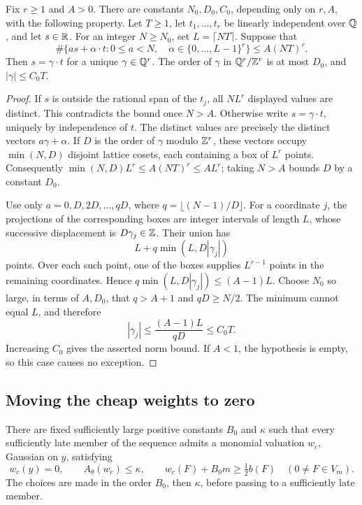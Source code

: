 \begin{lemma}\label{c:cheap-box-count}
Fix $r\ge1$ and $A>0$.  There are constants $N_0,D_0,C_0$, depending
only on $r,A$, with the following property.  Let $T\ge1$, let
$t_1,\ldots,t_r$ be linearly independent over $\mathbb Q$, and let $s\in\mathbb R$.
For an integer $N\ge N_0$, set $L=\lceil NT\rceil$.  Suppose that
\[
 \#\{as+\alpha\cdot t:0\le a<N,\quad
                    \alpha\in\{0,\ldots,L-1\}^r\}
       \le A(NT)^r.
\]
Then $s=\gamma\cdot t$ for a unique $\gamma\in\mathbb Q^r$.  The order of
$\gamma$ in $\mathbb Q^r/\mathbb Z^r$ is at most $D_0$, and
$|\gamma|\le C_0T$.
\end{lemma}

\begin{proof}
If $s$ is outside the rational span of the $t_j$, all $NL^r$ displayed
values are distinct.  This contradicts the bound once $N>A$.
Otherwise write $s=\gamma\cdot t$, uniquely by independence of $t$.
The distinct values are precisely the distinct vectors
$a\gamma+\alpha$.  If $D$ is the order of $\gamma$ modulo $\mathbb Z^r$,
these vectors occupy $\min(N,D)$ disjoint lattice cosets, each
containing a box of $L^r$ points.  Consequently
$\min(N,D)L^r\le A(NT)^r\le AL^r$; taking $N>A$ bounds $D$ by a
constant $D_0$.

Use only $a=0,D,2D,\ldots,qD$, where
$q=\lfloor(N-1)/D\rfloor$.  For a coordinate $j$, the projections of
the corresponding boxes are integer intervals of length $L$, whose
successive displacement is $D\gamma_j\in\mathbb Z$.  Their union has
\[
                 L+q\min(L,D|\gamma_j|)
\]
points.  Over each such point, one of the boxes supplies $L^{r-1}$
points in the remaining coordinates.  Hence
$q\min(L,D|\gamma_j|)\le(A-1)L$.  Choose $N_0$ so large, in terms
of $A,D_0$, that $q>A+1$ and $qD\ge N/2$.  The minimum cannot equal
$L$, and therefore
\[
             |\gamma_j|\le\frac{(A-1)L}{qD}\le C_0T.
\]
Increasing $C_0$ gives the asserted norm bound.  If $A<1$, the
hypothesis is empty, so this case causes no exception.
\end{proof}

\subsection{Moving the cheap weights to zero}

\begin{proposition}\label{c:cheap-collapse}
There are fixed sufficiently large positive constants $B_0$ and
$\kappa$ such that every sufficiently late member of the sequence
admits a monomial valuation $w_c$, Gaussian on $y$, satisfying
\[
 w_c(y)=0,\qquad A_\theta(w_c)\le\kappa,\qquad
                 w_c(F)+B_0m\ge\tfrac12 b(F)
       \quad(0\ne F\in V_m).
\]
The choices are made in the order $B_0$, then $\kappa$, before
passing to a sufficiently late member.
\end{proposition}

